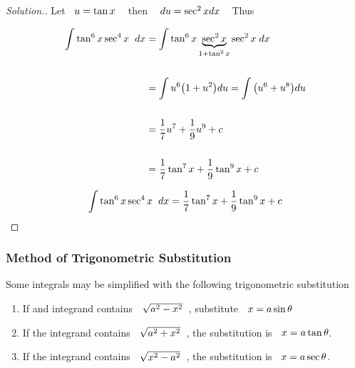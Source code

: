 \documentclass[11pt,a4paper]{article}
\theoremstyle{definition}
\newenvironment{solution}
  {\renewcommand{\qedsymbol}{}\begin{proof}[\textit{Solution}.]}
  {\end{proof}}
\begin{document}
\begin{solution}
Let $\hspace{0.2cm} u = \tan x\hspace{0.3cm}$ then $\hspace{0.3cm} du  = \sec^2xdx\hspace{0.3cm}$ Thus 

\begin{align*}
\int \tan^6x\sec^4x\hspace{0.2cm} dx & = \int \tan^6x\underbrace{\sec^2x}_{1 + \tan^2x}\sec^2x\hspace{0.1cm}dx\\\\
& = \int u^6\big(1 + u^2\big)du = \int\big(u^6 + u^8\big)du\\\\
& = \dfrac{1}{7}u^7 + \dfrac{1}{9}u^9 + c\\\\
& = \dfrac{1}{7}\tan^7x + \dfrac{1}{9}\tan^9x + c\\
\end{align*}

$$\int \tan^6x\sec^4x\hspace{0.2cm} dx = \dfrac{1}{7}\tan^7x + \dfrac{1}{9}\tan^9x + c$$
\end{solution}

\subsubsection{Method of Trigonometric Substitution}
Some integrals may be simplified with the following trigonometric substitution

\begin{enumerate}
\item If and integrand contains $\hspace{0.2cm} \sqrt{a^2 - x^2}\hspace{0.2cm}$, substitute $\hspace{0.2cm}  x = a\sin \theta$

\item If the integrand contains $\hspace{0.2cm} \sqrt{a^2 + x^2}\hspace{0.2cm}$, the substitution is $\hspace{0.2cm} x = a\tan \theta$.

\item If the integrand contains $\hspace{0.2cm} \sqrt{x^2 - a^2}\hspace{0.2cm}$, the substitution is $\hspace{0.2cm} x = a\sec \theta$.
\end{enumerate}
\end{document}
